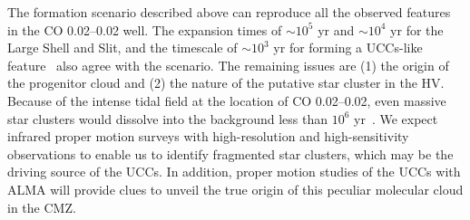 \documentclass[twocolumn]{aastex631}
\begin{document}
The formation scenario described above can reproduce all the observed features in the CO 0.02--0.02 well. The expansion times of $\sim\! 10^{5}$ yr and $\sim\! 10^{4}$ yr for the Large Shell and Slit, and the timescale of $\sim\! 10^{3}$ yr for forming a UCCs-like feature~\citep{Nomura18} also agree with the scenario. The remaining issues are (1) the origin of the progenitor cloud and (2) the nature of the putative star cluster in the HV. Because of the intense tidal field at the location of CO 0.02--0.02, even massive star clusters would dissolve into the background less than $10^6$ yr~\citep{Portegies-Zwart02}. We expect infrared proper motion surveys with high-resolution and high-sensitivity observations to enable us to identify fragmented star clusters, which may be the driving source of the UCCs. In addition, proper motion studies of the UCCs with ALMA will provide clues to unveil the true origin of this peculiar molecular cloud in the CMZ.
\end{document}

